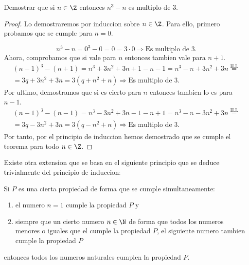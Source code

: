 \begin{example}
	Demostrar que si \(n \in  \Z \) entonces \(n^{3} - n \) es multiplo de 3.
\end{example}
\begin{proof}
	Lo demostraremos por induccion sobre \(n \in \Z\). Para ello, primero probamos que se cumple para \(n = 0\).

	\[
		n^{3} - n = 0^{3} - 0 = 0 = 3 \cdot 0 \Rightarrow \text{Es multiplo de 3.}
	\]
	Ahora, comprobamos que si vale para \(n \) entonces tambien vale para \(n + 1 \).
	\begin{multline*}
		(n+1)^{3} - (n+1) = n^{3} + 3n^{2} + 3n + 1 - n - 1 = n^{3} - n + 3n^{2} + 3n \overset{\text{H.I.} }{=} \\
		= 3q + 3n^{2} + 3n = 3(q + n^{2} + n) \Rightarrow \text{Es multiplo de 3. }
	\end{multline*}
	Por ultimo, demostramos que si es cierto para \(n\) entonces tambien lo es para \(n - 1 \).
	\begin{multline*}
		(n-1)^{3} - (n-1) = n^{3} - 3n^{2} + 3n - 1 - n + 1 = n^{3} - n - 3n^{2} + 3n \overset{\text{H.I.}}{=} \\ =  3q - 3n^{2} + 3n = 3(q - n^{2} + n) \Rightarrow \text{Es multiplo de 3.}
	\end{multline*}
	Por tanto, por el principio de induccion hemos demostrado que se cumple el teorema para todo \(n \in \Z \).
\end{proof}

Existe otra extension que se basa en el siguiente principio que se deduce trivialmente del principio de induccion:
\begin{proposition}
	Si \(P \) es una cierta propiedad de forma que se cumple simultaneamente:
	\begin{enumerate}
		\item el numero \(n = 1 \) cumple la propiedad \(P \)  y
		\item siempre que un cierto numero \(n \in  \N \) de forma que todos los numeros menores o iguales que el cumple la propiedad \(P \), el siguiente numero tambien cumple la propiedad \(P \)
	\end{enumerate}
	entonces todos los numeros naturales cumplen la propiedad \(P \).
\end{proposition}

